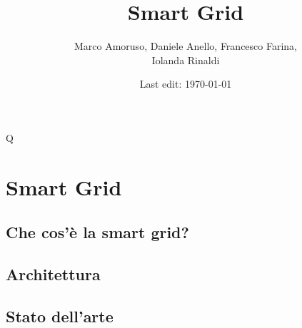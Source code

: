 \documentclass{article}
\title{Smart Grid} %
\author{Marco Amoruso, Daniele Anello, Francesco Farina, \\Iolanda Rinaldi } %
\date{Last edit: \today} %
\newcommand{\initial}[1]{ %
\lettrine[lines=3,lhang=0.3,nindent=0em]{
\color{DarkGoldenrod}
{\textsf{#1}}}{}}
\begin{document}
\maketitle %

\thispagestyle{fancy} %


\initial{Q}\textbf{}


\section{Smart Grid}
\subsection{Che cos'è la smart grid?}
\subsection{Architettura}
\subsection{Stato dell'arte}


\section{}

\begin{thebibliography}{99} %
\end{thebibliography}

\end{document}
